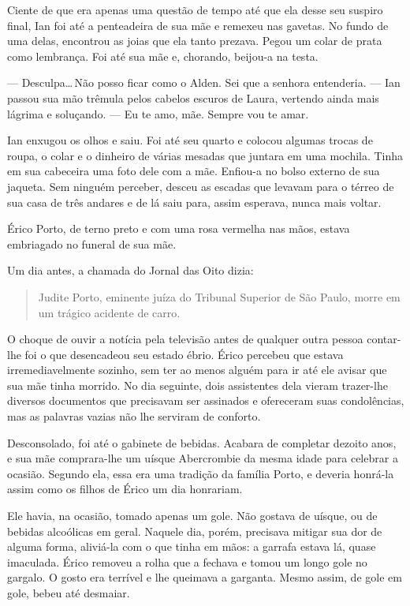 Ciente de que era apenas uma questão de tempo até que ela desse seu
suspiro final, Ian foi até a penteadeira de sua mãe e remexeu nas
gavetas. No fundo de uma delas, encontrou as joias que ela tanto
prezava. Pegou um colar de prata como lembrança. Foi até sua mãe e,
chorando, beijou-a na testa.

--- Desculpa\ldots\,Não posso ficar como o Alden. Sei que a senhora
entenderia. --- Ian passou sua mão trêmula pelos cabelos escuros de Laura,
vertendo ainda mais lágrima e soluçando. --- Eu te amo, mãe. Sempre vou te
amar.

Ian enxugou os olhos e saiu. Foi até seu quarto e colocou algumas trocas
de roupa, o colar e o dinheiro de várias mesadas que juntara em uma
mochila. Tinha em sua cabeceira uma foto dele com a mãe. Enfiou-a no
bolso externo de sua jaqueta. Sem ninguém perceber, desceu as escadas
que levavam para o térreo de sua casa de três andares e de lá saiu para,
assim esperava, nunca mais voltar.

\espaco


Érico Porto, de terno preto e com uma rosa vermelha nas mãos, estava
embriagado no funeral de sua mãe.

Um dia antes, a chamada do Jornal das Oito dizia:

  \begin{quote}
  Judite Porto, eminente juíza do Tribunal Superior de São Paulo, morre
  em um trágico acidente de carro.
  \end{quote}

O choque de ouvir a notícia pela televisão antes de qualquer outra
pessoa contar-lhe foi o que desencadeou seu estado ébrio. Érico percebeu
que estava irremediavelmente sozinho, sem ter ao menos alguém para ir
até ele avisar que sua mãe tinha morrido. No dia seguinte, dois
assistentes dela vieram trazer-lhe diversos documentos que precisavam
ser assinados e ofereceram suas condolências, mas as palavras vazias não
lhe serviram de conforto.

Desconsolado, foi até o gabinete de bebidas. Acabara de completar
dezoito anos, e sua mãe comprara-lhe um uísque Abercrombie da mesma
idade para celebrar a ocasião. Segundo ela, essa era uma tradição da
família Porto, e deveria honrá-la assim como os filhos de Érico um dia
honrariam.

Ele havia, na ocasião, tomado apenas um gole. Não gostava de uísque, ou
de bebidas alcoólicas em geral. Naquele dia, porém, precisava mitigar
sua dor de alguma forma, aliviá-la com o que tinha em mãos: a garrafa
estava lá, quase imaculada. Érico removeu a rolha que a fechava e tomou
um longo gole no gargalo. O gosto era terrível e lhe queimava a
garganta. Mesmo assim, de gole em gole, bebeu até desmaiar.

